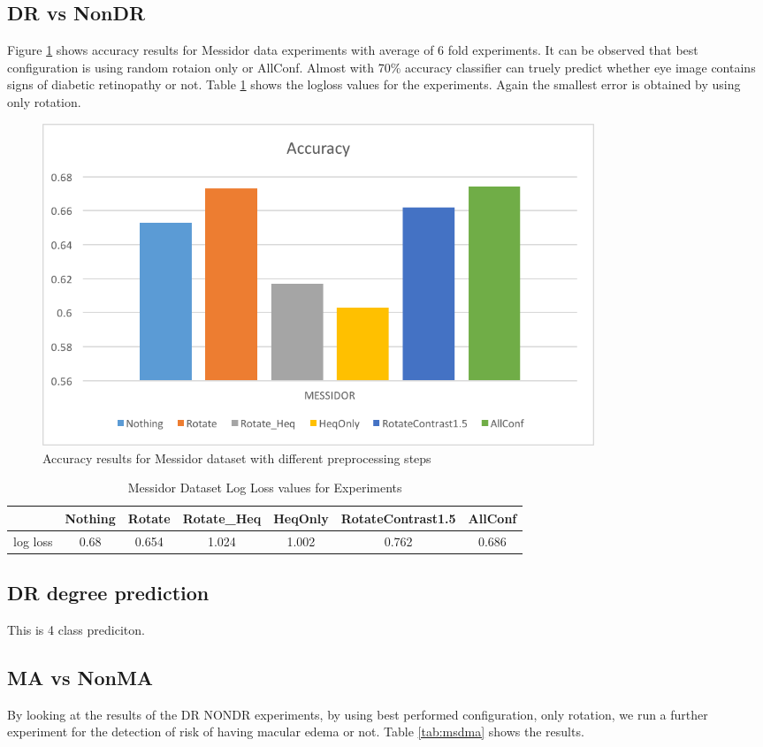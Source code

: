 \subsection{DR vs NonDR}
Figure \ref{messidoracc} shows accuracy results for Messidor data experiments with average of 6 fold experiments. It can be observed that best configuration is using random rotaion only or AllConf. Almost with 70\% accuracy classifier can truely predict whether eye image contains signs of diabetic retinopathy or not. Table \ref{tab:msdll} shows the logloss values for the experiments. Again the smallest error is obtained by using only rotation.

\begin{figure}[!htbbp]
\centering
\includegraphics[width=0.8\textwidth]{Figures/messidor.png}
\caption{Accuracy results for Messidor dataset with different preprocessing steps}
\label{messidoracc}
\end{figure}

\begin{table}[t]
\centering
\caption{Messidor Dataset Log Loss values for Experiments} \label{tab:msdll}
\begin{tabular}{|c|c|c|c|c|c|c|} \hline
 & Nothing & Rotate & Rotate\_Heq & HeqOnly & RotateContrast1.5 & AllConf \\ \hline
log loss & 0.68 & 0.654 & 1.024 & 1.002 & 0.762 & 0.686 \\ \hline
\end{tabular}
\end{table}

\subsection{DR degree prediction}
This is 4 class prediciton.
\subsection{MA vs NonMA}
By looking at the results of the DR NONDR experiments, by using best performed configuration, only rotation, we run a further experiment for the detection of risk of having macular edema or not. Table \ref{tab:msdma} shows the results.  


